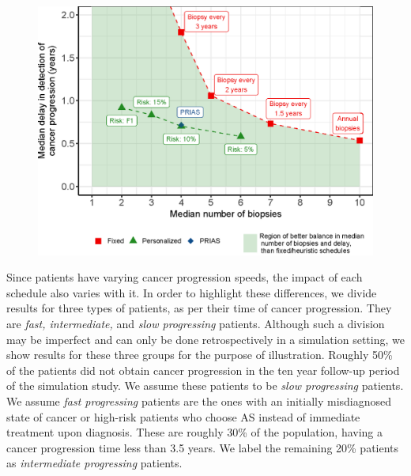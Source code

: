 \documentclass[Afour,sagev,times]{sagej}
\begin{document}
\begin{figure}[!htb]
\captionsetup{justification=justified}
\centerline{\includegraphics[width=\columnwidth]{Figure5.eps}}

\label{Figure5}
\end{figure}

Since patients have varying cancer progression speeds, the impact of each schedule also varies with it. In order to highlight these differences, we divide results for three types of patients, as per their time of cancer progression. They are \textit{fast, intermediate,} and \textit{slow progressing} patients. Although such a division may be imperfect and can only be done retrospectively in a simulation setting, we show results for these three groups for the purpose of illustration. Roughly 50\% of the patients did not obtain cancer progression in the ten year follow-up period of the simulation study. We assume these patients to be \textit{slow progressing} patients. We assume \textit{fast progressing} patients are the ones with an initially misdiagnosed state of cancer \cite{cooperberg2011outcomes} or high-risk patients who choose AS instead of immediate treatment upon diagnosis. These are roughly 30\% of the population, having a cancer progression time less than 3.5 years. We label the remaining 20\% patients as \textit{intermediate progressing} patients. 
\end{document}
